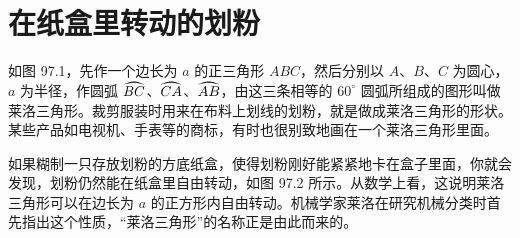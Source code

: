 \section{在纸盒里转动的划粉}

\par\medskip\noindent
\begin{minipage}[c]{0.55\textwidth}
  \hspace{2em}如图 97.1，先作一个边长为 $a$ 的正三角形 $ABC$，然后分别以 $A$、$B$、$C$ 为圆心，$a$ 为半径，作圆弧 $\arc{BC}$、$\arc{CA}$、$\arc{AB}$，由这三条相等的 $60^\circ$ 圆弧所组成的图形叫做莱洛三角形。裁剪服装时用来在布料上划线的划粉，就是做成莱洛三角形的形状。某些产品如电视机、手表等的商标，有时也很别致地画在一个莱洛三角形里面。
\end{minipage}%
\hfill
\begin{minipage}[c]{0.41\textwidth}
  \centering
  \par\vspace{3pt}{\footnotesize 图\ 97.1}
\end{minipage}
\par\medskip

如果糊制一只存放划粉的方底纸盒，使得划粉刚好能紧紧地卡在盒子里面，你就会发现，划粉仍然能在纸盒里自由转动，如图 97.2 所示。从数学上看，这说明莱洛三角形可以在边长为 $a$ 的正方形内自由转动。机械学家莱洛在研究机械分类时首先指出这个性质，“莱洛三角形”的名称正是由此而来的。

